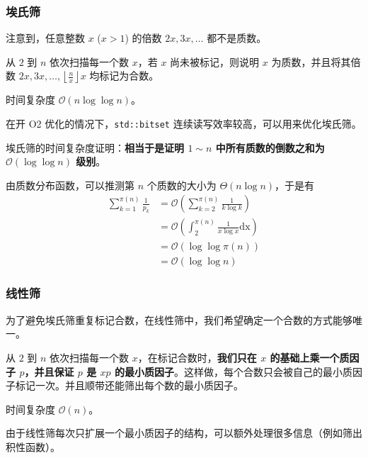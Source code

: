 \subsubsection{埃氏筛}

注意到，任意整数 $x$ ($x > 1$) 的倍数 $2x, 3x, \dots$ 都不是质数。

从 $2$ 到 $n$ 依次扫描每一个数 $x$，若 $x$ 尚未被标记，则说明 $x$ 为质数，并且将其倍数 $2x, 3x, \dots, \left\lfloor \frac{n}{x} \right\rfloor x$ 均标记为合数。

时间复杂度 $\mathcal{O}(n \log \log n)$。

在开 O2 优化的情况下，\texttt{std::bitset} 连续读写效率较高，可以用来优化埃氏筛。

\begin{quoteblock}
埃氏筛的时间复杂度证明：\textbf{相当于是证明 $1 \sim n$ 中所有质数的倒数之和为 $\mathcal{O}(\log \log n)$ 级别}。

由质数分布函数，可以推测第 $n$ 个质数的大小为 $\Theta(n \log n)$，于是有
\[
\begin{aligned}
\sum_{k = 1}^{\pi(n)} \frac{1}{p_k} & = \mathcal{O}\left( \sum_{k = 2}^{\pi(n)} \frac{1}{k \log k} \right) \\
& = \mathcal{O}\left(\int_2^{\pi(n)} \frac{1}{x \log x} \mathrm{dx} \right) \\
& = \mathcal{O}(\log \log \pi(n)) \\
& = \mathcal{O}(\log \log n)
\end{aligned}
\]
\end{quoteblock}


\subsubsection{线性筛}

为了避免埃氏筛重复标记合数，在线性筛中，我们希望确定一个合数的方式能够唯一。

从 $2$ 到 $n$ 依次扫描每一个数 $x$，在标记合数时，\textbf{我们只在 $x$ 的基础上乘一个质因子 $p$，并且保证 $p$ 是 $xp$ 的最小质因子}。这样做，每个合数只会被自己的最小质因子标记一次。并且顺带还能筛出每个数的最小质因子。

时间复杂度 $\mathcal{O}(n)$。

由于线性筛每次只扩展一个最小质因子的结构，可以额外处理很多信息（例如筛出积性函数）。


